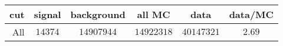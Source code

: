 \begin{tabular}{r|c|c|c|c|c}
cut&signal&background&all MC&data&data/MC\\
\hline
All&$14374$&$14907944$&$14922318$&$40147321$&$2.69$\\
\end{tabular}
